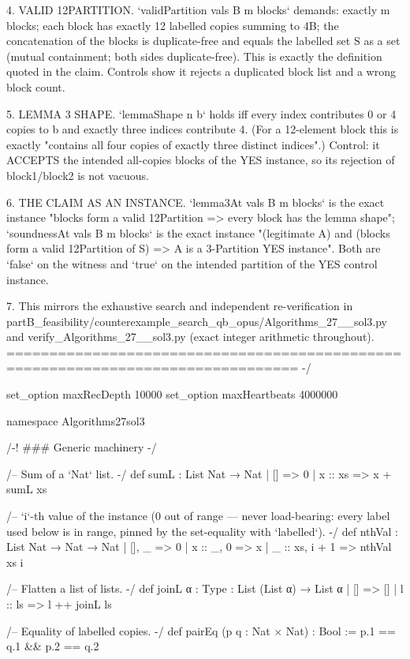 \documentclass[11pt]{article}
\begin{document}
\begin{Vlean}
 4. VALID 12PARTITION.  `validPartition vals B m blocks` demands: exactly m
    blocks; each block has exactly 12 labelled copies summing to 4B; the
    concatenation of the blocks is duplicate-free and equals the labelled
    set S as a set (mutual containment; both sides duplicate-free).  This
    is exactly the definition quoted in the claim.  Controls show it
    rejects a duplicated block list and a wrong block count.

 5. LEMMA 3 SHAPE.  `lemmaShape n b` holds iff every index contributes 0 or
    4 copies to b and exactly three indices contribute 4.  (For a 12-element
    block this is exactly "contains all four copies of exactly three
    distinct indices".)  Control: it ACCEPTS the intended all-copies blocks
    of the YES instance, so its rejection of block1/block2 is not vacuous.

 6. THE CLAIM AS AN INSTANCE.  `lemma3At vals B m blocks` is the exact
    instance "blocks form a valid 12Partition => every block has the lemma
    shape"; `soundnessAt vals B m blocks` is the exact instance
    "(legitimate A) and (blocks form a valid 12Partition of S) => A is a
    3-Partition YES instance".  Both are `false` on the witness and `true`
    on the intended partition of the YES control instance.

 7. This mirrors the exhaustive search and independent re-verification in
    partB_feasibility/counterexample_search_qb_opus/Algorithms_27__sol3.py
    and verify_Algorithms_27__sol3.py (exact integer arithmetic throughout).
================================================================================
-/

set_option maxRecDepth 10000
set_option maxHeartbeats 4000000

namespace Algorithms27sol3

/-! ### Generic machinery -/

/-- Sum of a `Nat` list. -/
def sumL : List Nat → Nat
  | [] => 0
  | x :: xs => x + sumL xs

/-- `i`-th value of the instance (0 out of range — never load-bearing: every
label used below is in range, pinned by the set-equality with `labelled`). -/
def nthVal : List Nat → Nat → Nat
  | [], _ => 0
  | x :: _, 0 => x
  | _ :: xs, i + 1 => nthVal xs i

/-- Flatten a list of lists. -/
def joinL {α : Type} : List (List α) → List α
  | [] => []
  | l :: ls => l ++ joinL ls

/-- Equality of labelled copies. -/
def pairEq (p q : Nat × Nat) : Bool := p.1 == q.1 && p.2 == q.2


\end{Vlean}
\end{document}
